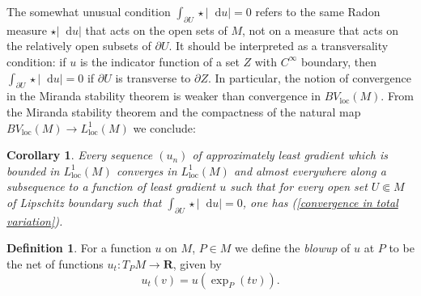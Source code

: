 \documentclass[reqno,11pt]{amsart}
\newcommand{\RR}{\mathbf{R}}
\newcommand*\dif{\mathop{}\!\mathrm{d}}
\newcommand{\dfn}[1]{\emph{#1}\index{#1}}
\newcommand{\loc}{\mathrm{loc}}
\newtheorem{corollary}[theorem]{Corollary}
\theoremstyle{definition}
\newtheorem{definition}[theorem]{Definition}
\numberwithin{equation}{section}
\begin{document}
The somewhat unusual condition $\int_{\partial U} \star |\dif u| = 0$ refers to the same Radon measure $\star |\dif u|$ that acts on the open sets of $M$, not on a measure that acts on the relatively open subsets of $\partial U$.
It should be interpreted as a transversality condition: if $u$ is the indicator function of a set $Z$ with $C^\infty$ boundary, then $\int_{\partial U} \star |\dif u| = 0$ if $\partial U$ is transverse to $\partial Z$.
In particular, the notion of convergence in the Miranda stability theorem is weaker than convergence in $BV_\loc(M)$.
From the Miranda stability theorem and the compactness of the natural map $BV_\loc(M) \to L^1_\loc(M)$ we conclude:

\begin{corollary}\label{compactness}
Every sequence $(u_n)$ of approximately least gradient which is bounded in $L^1_\loc(M)$ converges in $L^1_\loc(M)$ and almost everywhere along a subsequence to a function of least gradient $u$ such that for every open set $U \Subset M$ of Lipschitz boundary such that $\int_{\partial U} \star |\dif u| = 0$, one has (\ref{convergence in total variation}).
\end{corollary}

\begin{definition}
For a function $u$ on $M$, $P \in M$ we define the \dfn{blowup} of $u$ at $P$ to be the net of functions $u_t: T_PM \to \RR$, given by
$$u_t(v) = u\left(\exp_P(tv)\right).$$
\end{definition}
\end{document}
